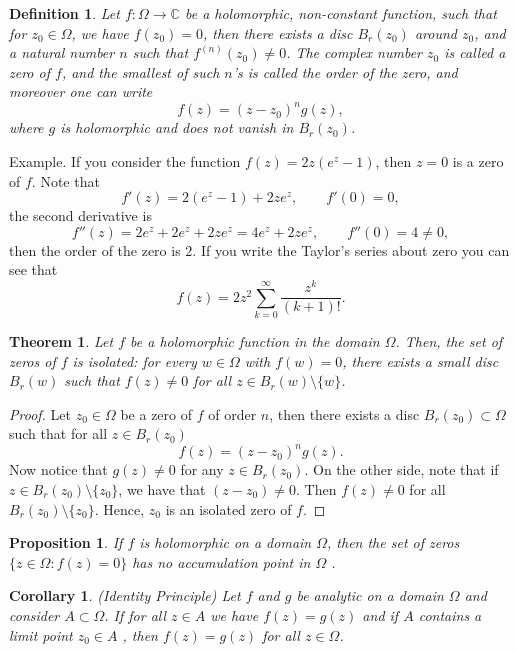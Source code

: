 \documentclass{amsart}
\newtheorem{thm}{Theorem}
\newtheorem{prop}{Proposition}
\newtheorem{cor}{Corollary}
\newtheorem{mydef}{Definition}
\begin{document}
\begin{mydef}
Let \(f:\Omega \to \mathbb{C}\) be a holomorphic, non-constant function, such that for \(z_0\in \Omega\), we have \(f(z_0)= 0\), then there exists a disc  \(B_r(z_0)\) around \(z_0\), and a natural number \(n\) such that \(f^{(n)}(z_0) \neq 0\). The complex number \(z_0\) is called a \alert{zero}  of \(f\), and the smallest of such \(n\)'s is called the order of the zero, and moreover one can write \[ f(z) = (z-z_0)^n g(z), \] where \(g\) is holomorphic and does not vanish in \(B_r(z_0)\).
\end{mydef}

\alert{Example}. If you consider the function \(f(z) = 2z (e^z -1)\), then \(z = 0\) is a zero of \(f\). Note that \[ f'(z) = 2(e^z -1) + 2ze^z, \qquad f'(0) = 0, \] the second derivative is \[ f''(z) = 2e^z + 2e^z + 2ze^z = 4e^z + 2ze^z, \qquad f''(0) = 4 \neq 0, \] then the order of the zero is \(2\).
If you write the Taylor's series about zero you can see that
\[ f(z) = 2z^2 \sum_{k=0}^{\infty} \frac{z^k}{(k+1)!}. \]


\begin{thm}
Let \(f\) be a holomorphic function in the domain \(\Omega\). Then, the set of zeros of \(f\) is isolated: for every \(w\in \Omega\) with \(f(w) = 0\), there exists a small disc \(B_{r}(w)\) such that \(f(z) \neq 0\) for all \(z\in B_r(w)\setminus \{w\}\).
\end{thm}
\begin{proof}
Let \(z_0\in \Omega\) be a zero of \(f\) of  order \(n\),  then there exists a disc \(B_r(z_0)\subset \Omega\) such that for all \(z\in B_r(z_0)\) 
\[ f(z) = (z-z_0)^n g(z). \]
Now notice that  \(g(z) \neq 0\) for any \(z \in B_r(z_0)\). On the other side, note that  if \(z \in B_r(z_0)\setminus \{z_0\}\), we have that  \((z-z_0)\neq 0\). Then \(f(z) \neq 0\) for all \(B_r(z_0)\setminus\{z_0\}\). Hence, \(z_0\) is an isolated zero of \(f\).
\end{proof}


\begin{prop}
If \(f\) is holomorphic on a domain  \(\Omega\), then the set of zeros \(\{z \in \Omega : f(z) = 0\}\) has no accumulation point in \(\Omega\) .
\end{prop}

\begin{cor}
(Identity Principle) Let \(f\)  and \(g\)  be analytic on a domain \(\Omega\) and consider \(A\subset \Omega\).  If for all \(z\in A\) we have \(f(z)=g(z)\) and if \(A\) contains a limit point \(z_0\in A\) , then \(f(z) = g(z)\) for all \(z\in \Omega\).
\end{cor}
\end{document}
